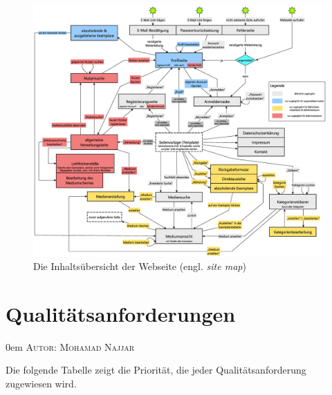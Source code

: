 \documentclass{article}
\makeatletter
\newcommand{\sectionauthor}[1]{
	{\parindent 0em \large \scshape Autor: #1 \par \nobreak \vspace*{2em}}
	\@afterheading
}
\makeatother
\begin{document}
\begin{figure}[h]
    \centering
    \includegraphics[angle = 270, width = 60em]{site_map}
    \caption{Die Inhaltsübersicht der Webseite (engl. \textit{site map})}
    \label{site_map}
\end{figure}

\restoregeometry
\newpage

\section{Qualitätsanforderungen} %
\sectionauthor{Mohamad Najjar}

	Die folgende Tabelle zeigt die Priorität, die jeder Qualitätsanforderung zugewiesen wird.
\end{document}
